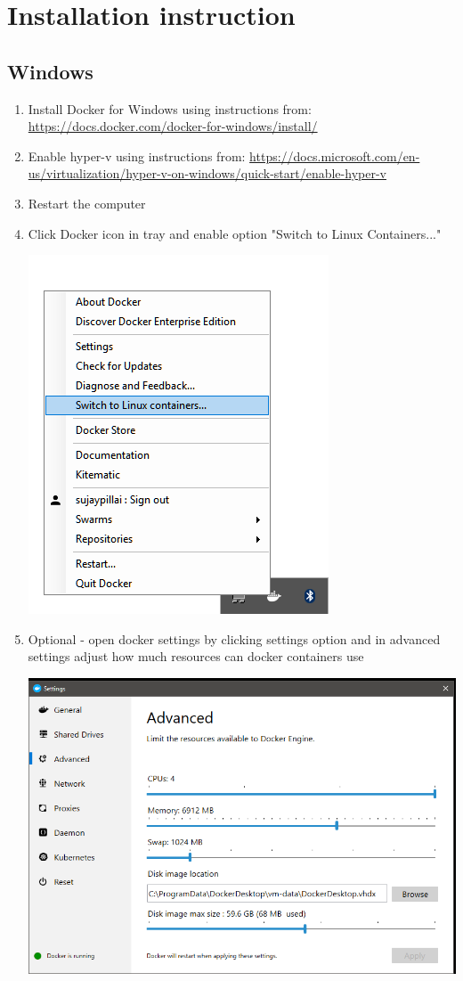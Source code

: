 \chapter{Installation instruction}
\label{appendix:B}
\section{Windows}
\begin{enumerate}
    \item Install Docker for Windows using instructions from: \newline
    \url{https://docs.docker.com/docker-for-windows/install/}
    \item Enable hyper-v using instructions from: \newline
    \url{https://docs.microsoft.com/en-us/virtualization/hyper-v-on-windows/quick-start/enable-hyper-v}
    \item Restart the computer
    \item Click Docker icon in tray and enable option "Switch to Linux Containers..." \newline
        \begin{minipage}{\linewidth}
            \centering
        	\includegraphics[width=0.4\linewidth]{instructions/systemtray.png}
        \end{minipage}
    \item Optional - open docker settings by clicking settings option and  in advanced settings adjust how much resources can docker containers use
    \newline
        \begin{minipage}{\linewidth}
            \centering
        	\includegraphics[width=0.4\linewidth]{instructions/res.PNG}

\end{minipage}
\end{enumerate}
